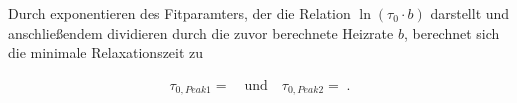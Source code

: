 Durch exponentieren des Fitparamters, der die Relation $\ln(\tau_0\cdot b)$ darstellt und anschließendem dividieren durch die zuvor berechnete Heizrate $b$, berechnet sich die minimale Relaxationszeit zu

\begin{align}
	\tau_{0,Peak1} =   \quad \text{und} \quad \tau_{0,Peak2} = \;.
\end{align}


%
%
%     
%
%
